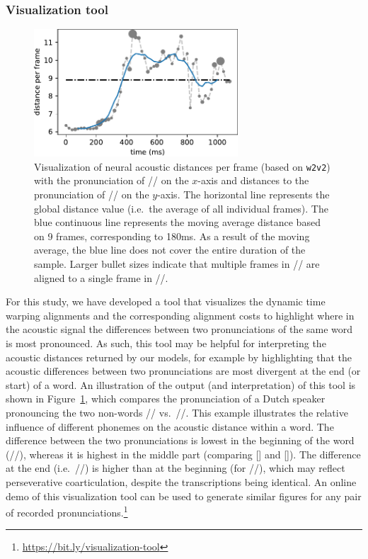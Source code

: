 \documentclass[11pt,a4paper]{article}
\begin{document}
\subsubsection{Visualization tool}

\begin{figure}[ht]
  \begin{center}
    \includegraphics[width=3in]{figures/falling_huud_hood_mobiel_v2.pdf}
    \caption{Visualization of neural acoustic distances per frame (based on \texttt{w2v2}) with the pronunciation of // on the $x$-axis and distances to the pronunciation of // on the $y$-axis. The horizontal line represents the global distance value (i.e.~the average of all individual frames). The blue continuous line represents the moving average distance based on 9 frames, corresponding to 180ms. As a result of the moving average, the blue line does not cover the entire duration of the sample. Larger bullet sizes indicate that multiple frames in // are aligned to a single frame in //. }
    \label{fig:hXXd-distance}
  \end{center} 
\end{figure}

For this study, we have developed a tool that visualizes the dynamic time warping alignments and the corresponding alignment costs to highlight where in the acoustic signal the differences between two pronunciations of the same word is most pronounced. As such, this tool may be helpful for interpreting the acoustic distances returned by our models, for example by highlighting that the acoustic differences between two pronunciations are most divergent at the end (or start) of a word. An illustration of the output (and interpretation) of this tool is shown in Figure~\ref{fig:hXXd-distance}, which compares the pronunciation of a Dutch speaker pronouncing the two non-words // vs.~//. This example illustrates the relative influence of different phonemes on the acoustic distance within a word. The difference between the two pronunciations is lowest in the beginning of the word (//), whereas it is highest in the middle part (comparing [] and []). The difference at the end (i.e.~//) is higher than at the beginning (for //), which may reflect perseverative coarticulation, despite the transcriptions being identical. An online demo of this visualization tool can be used to generate similar figures for any pair of recorded pronunciations.\footnote{\url{https://bit.ly/visualization-tool}}
\end{document}
